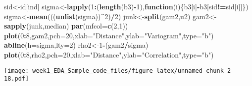\documentclass[]{article}
\newenvironment{Shaded}{\begin{snugshade}}{\end{snugshade}}
\newcommand{\ControlFlowTok}[1]{\textcolor[rgb]{0.13,0.29,0.53}{\textbf{#1}}}
\newcommand{\DataTypeTok}[1]{\textcolor[rgb]{0.13,0.29,0.53}{#1}}
\newcommand{\DecValTok}[1]{\textcolor[rgb]{0.00,0.00,0.81}{#1}}
\newcommand{\KeywordTok}[1]{\textcolor[rgb]{0.13,0.29,0.53}{\textbf{#1}}}
\newcommand{\NormalTok}[1]{#1}
\newcommand{\OperatorTok}[1]{\textcolor[rgb]{0.81,0.36,0.00}{\textbf{#1}}}
\newcommand{\StringTok}[1]{\textcolor[rgb]{0.31,0.60,0.02}{#1}}
\begin{document}
\begin{Shaded}
\begin{Highlighting}[]
\NormalTok{sid<-id[ind]}
\NormalTok{sigma<-}\KeywordTok{lapply}\NormalTok{(}\DecValTok{1}\OperatorTok{:}\NormalTok{(}\KeywordTok{length}\NormalTok{(b3)}\OperatorTok{-}\DecValTok{1}\NormalTok{),}\ControlFlowTok{function}\NormalTok{(i)\{b3[i]}\OperatorTok{-}\NormalTok{b3[sid}\OperatorTok{!=}\NormalTok{sid[i]]\})}
\NormalTok{sigma<-}\KeywordTok{mean}\NormalTok{(((}\KeywordTok{unlist}\NormalTok{(sigma))}\OperatorTok{^}\DecValTok{2}\NormalTok{)}\OperatorTok{/}\DecValTok{2}\NormalTok{)}
\NormalTok{junk<-}\KeywordTok{split}\NormalTok{(gam2,u2)}
\NormalTok{gam2<-}\KeywordTok{sapply}\NormalTok{(junk,median)}
\KeywordTok{par}\NormalTok{(}\DataTypeTok{mfcol=}\KeywordTok{c}\NormalTok{(}\DecValTok{2}\NormalTok{,}\DecValTok{1}\NormalTok{))}
\KeywordTok{plot}\NormalTok{(}\DecValTok{0}\OperatorTok{:}\DecValTok{8}\NormalTok{,gam2,}\DataTypeTok{pch=}\DecValTok{20}\NormalTok{,}\DataTypeTok{xlab=}\StringTok{"Distance"}\NormalTok{,}\DataTypeTok{ylab=}\StringTok{"Variogram"}\NormalTok{,}\DataTypeTok{type=}\StringTok{"b"}\NormalTok{)}
\KeywordTok{abline}\NormalTok{(}\DataTypeTok{h=}\NormalTok{sigma,}\DataTypeTok{lty=}\DecValTok{2}\NormalTok{)}
\NormalTok{rho2<-}\DecValTok{1}\OperatorTok{-}\NormalTok{(gam2}\OperatorTok{/}\NormalTok{sigma)}
\KeywordTok{plot}\NormalTok{(}\DecValTok{0}\OperatorTok{:}\DecValTok{8}\NormalTok{,rho2,}\DataTypeTok{pch=}\DecValTok{20}\NormalTok{,}\DataTypeTok{xlab=}\StringTok{"Distance"}\NormalTok{,}\DataTypeTok{ylab=}\StringTok{"Correlation"}\NormalTok{,}\DataTypeTok{type=}\StringTok{"b"}\NormalTok{)}
\end{Highlighting}
\end{Shaded}

\texttt{[image: week1\_EDA\_Sample\_code\_files/figure-latex/unnamed-chunk-2-18.pdf]}
\end{document}
